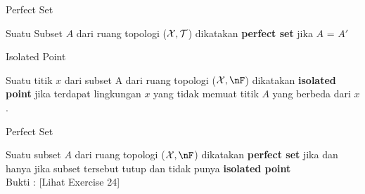 \begin{frame}{Perfect Set}
    \begin{tcolorbox}[enhanced,title= Definisi, frame style tile={width=\paperwidth}{\wallpaper}]
        Suatu Subset $A$ dari ruang topologi ($\mathcal{X}, \mathcal{T}$) dikatakan \textbf{perfect set} jika $A$ = $A'$  \\
    \end{tcolorbox}
\end{frame}

\begin{frame}{Isolated Point}
    \begin{tcolorbox}[enhanced,title= Definisi, frame style tile={width=\paperwidth}{\wallpaper}]
        Suatu titik $x$ dari subset A dari ruang topologi ($\nX, \nF$) dikatakan \textbf{isolated point} jika terdapat lingkungan $x$ yang tidak memuat titik $A$ yang berbeda dari $x$.

    \end{tcolorbox}
\end{frame}

\begin{frame}{Perfect Set}
    \begin{tcolorbox}[enhanced,title= Teorema 1.27, frame style tile={width=\paperwidth}{\wallpaper}]
        Suatu subset $A$ dari ruang topologi ($\nX, \nF$) dikatakan \textbf{perfect set} jika dan hanya jika subset tersebut tutup dan tidak punya \textbf{isolated point} \\
        Bukti : [Lihat Exercise 24]

    \end{tcolorbox}
\end{frame}